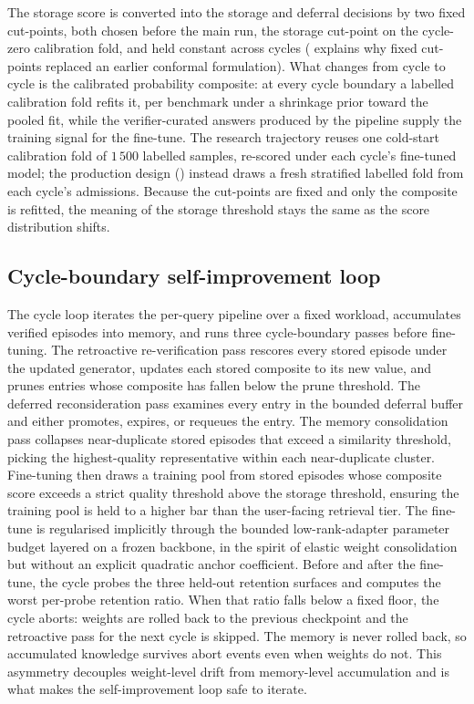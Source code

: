 The storage score is converted into the storage and deferral decisions by two fixed cut-points, both chosen before the main run, the storage cut-point on the cycle-zero calibration fold, and held constant across cycles ( explains why fixed cut-points replaced an earlier conformal formulation). What changes from cycle to cycle is the calibrated probability composite: at every cycle boundary a labelled calibration fold refits it, per benchmark under a shrinkage prior toward the pooled fit, while the verifier-curated answers produced by the pipeline supply the training signal for the fine-tune. The research trajectory reuses one cold-start calibration fold of $1\,500$ labelled samples, re-scored under each cycle's fine-tuned model; the production design () instead draws a fresh stratified labelled fold from each cycle's admissions. Because the cut-points are fixed and only the composite is refitted, the meaning of the storage threshold stays the same as the score distribution shifts.

\subsection{Cycle-boundary self-improvement loop}
\label{sec:cycle-loop}

The cycle loop iterates the per-query pipeline over a fixed workload, accumulates verified episodes into memory, and runs three cycle-boundary passes before fine-tuning. The retroactive re-verification pass rescores every stored episode under the updated generator, updates each stored composite to its new value, and prunes entries whose composite has fallen below the prune threshold. The deferred reconsideration pass examines every entry in the bounded deferral buffer and either promotes, expires, or requeues the entry. The memory consolidation pass collapses near-duplicate stored episodes that exceed a similarity threshold, picking the highest-quality representative within each near-duplicate cluster. Fine-tuning then draws a training pool from stored episodes whose composite score exceeds a strict quality threshold above the storage threshold, ensuring the training pool is held to a higher bar than the user-facing retrieval tier. The fine-tune is regularised implicitly through the bounded low-rank-adapter parameter budget layered on a frozen backbone, in the spirit of elastic weight consolidation \cite{doi:10.1073/pnas.1611835114} but without an explicit quadratic anchor coefficient. Before and after the fine-tune, the cycle probes the three held-out retention surfaces and computes the worst per-probe retention ratio. When that ratio falls below a fixed floor, the cycle aborts: weights are rolled back to the previous checkpoint and the retroactive pass for the next cycle is skipped. The memory is never rolled back, so accumulated knowledge survives abort events even when weights do not. This asymmetry decouples weight-level drift from memory-level accumulation and is what makes the self-improvement loop safe to iterate.

